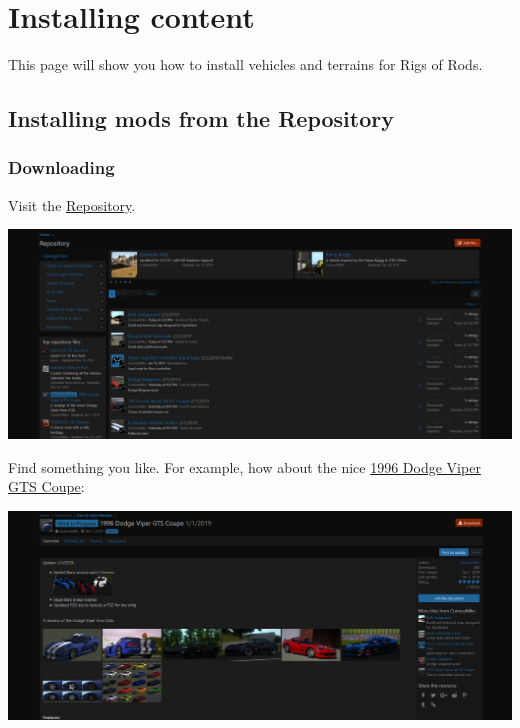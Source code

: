 \hypertarget{installing-content}{%
\chapter{Installing content}\label{installing-content}}

This page will show you how to install vehicles and terrains for Rigs of
Rods.

\hypertarget{installing-mods-from-the-repository}{%
\section{Installing mods from the
Repository}\label{installing-mods-from-the-repository}}

\hypertarget{downloading}{%
\subsection{Downloading}\label{downloading}}

Visit the \href{https://forum.rigsofrods.org/resources/}{Repository}.

\includegraphics{images/repository.png}

Find something you like. For example, how about the nice
\href{https://forum.rigsofrods.org/resources/1996-dodge-viper-gts-coupe.88/}{1996
Dodge Viper GTS Coupe}:

\includegraphics{images/repository-mod.png}

